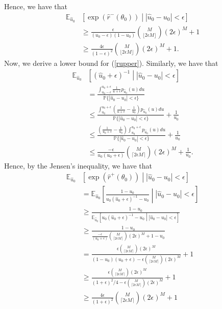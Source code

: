 \documentclass[letterpaper]{article} %
\begin{document}
Hence, we have that
\begin{align}
\mathbb{E}_{\hat{u}_0}&\left[\exp(\hat{r}^-(\theta_0))\middle||\hat{u}_0-u_0|<\epsilon\right]\\
&\geq\frac{\epsilon}{(u_0-\epsilon)(1-u_0)}\binom{M}{\lfloor 2\epsilon M\rfloor}(2\epsilon)^M+1\\
&\geq\frac{4\epsilon}{(1-\epsilon)^2}\binom{M}{\lfloor 2\epsilon M\rfloor}(2\epsilon)^M+1.
\end{align}
Now, we derive a lower bound for (\ref{rupper}). Similarly, we have that
\begin{align}
\mathbb{E}_{\hat{u}_0}&\left[(\hat{u}_0+\epsilon)^{-1}\middle||\hat{u}_0-u_0|<\epsilon\right]\\
&=\frac{\int_{u_0-\epsilon}^{u_0+\epsilon}\frac{1}{u+\epsilon}p_{\hat{u}_0}(u)du}{\mathbb{P}\{|\hat{u}_0-u_0|<\epsilon\}}\\
&\leq \frac{\int_{u_0}^{u_0+\epsilon}\left(\frac{1}{u+\epsilon}-\frac{1}{u_0}\right)p_{\hat{u}_0}(u)du}{\mathbb{P}\{|\hat{u}_0-u_0|<\epsilon\}}+\frac{1}{u_0}\\
&\leq \frac{\left(\frac{1}{u_0+\epsilon}-\frac{1}{u_0}\right)\int_{u_0}^{u_0+\epsilon}p_{\hat{u}_0}(u)du}{\mathbb{P}\{|\hat{u}_0-u_0|<\epsilon\}}+\frac{1}{u_0}\\
&\leq \frac{-\epsilon}{u_0(u_0+\epsilon)}\binom{M}{\lceil 2\epsilon M\rceil}(2\epsilon)^M+\frac{1}{u_0}.
\end{align}
Hence, by the Jensen's inequality, we have that
\begin{align}
\mathbb{E}_{\hat{u}_0}&\left[\exp(\hat{r}^+(\theta_0))\middle||\hat{u}_0-u_0|<\epsilon\right]\\
&=\mathbb{E}_{\hat{u}_0}\left[\frac{1-u_0}{u_0(\hat{u}_0+\epsilon)^{-1}-u_0}\middle||\hat{u}_0-u_0|<\epsilon\right]\\
&\geq \frac{1-u_0}{\mathbb{E}_{\hat{u}_0}\left[{u_0(\hat{u}_0+\epsilon)^{-1}-u_0}\middle||\hat{u}_0-u_0|<\epsilon\right]}\\
&\geq \frac{1-u_0}{\frac{-\epsilon}{(u_0+\epsilon)}\binom{M}{\lceil 2\epsilon M\rceil}(2\epsilon)^M+{1}-{u_0}}\\
&=\frac{\epsilon\binom{M}{\lceil 2\epsilon M\rceil}(2\epsilon)^M}{(1-u_0)(u_0+\epsilon)-\epsilon\binom{M}{\lceil 2\epsilon M\rceil}(2\epsilon)^M}+1\\
&\geq \frac{\epsilon\binom{M}{\lceil 2\epsilon M\rceil}(2\epsilon)^M}{(1+\epsilon)^2/4-\epsilon\binom{M}{\lceil 2\epsilon M\rceil}(2\epsilon)^M}+1\\
&\geq \frac{4\epsilon}{(1+\epsilon)^2}\binom{M}{\lceil 2\epsilon M\rceil}(2\epsilon)^M+1
\end{align}
\end{document}
